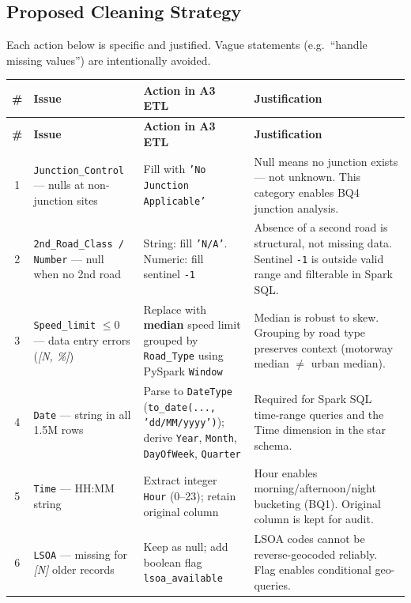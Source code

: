 \documentclass[12pt, a4paper]{article}
\newcommand{\ph}[1]{{\color{phred}\textit{[#1]}}}
\begin{document}
\subsection{Proposed Cleaning Strategy}

Each action below is specific and justified.
Vague statements (e.g.\ ``handle missing values'') are intentionally avoided.

\begin{longtable}{c L{3cm} L{5cm} L{4.2cm}}
\toprule
\textbf{\#} & \textbf{Issue} & \textbf{Action in A3 ETL} & \textbf{Justification} \\
\midrule
\endfirsthead
\toprule
\textbf{\#} & \textbf{Issue} & \textbf{Action in A3 ETL} & \textbf{Justification} \\
\midrule
\endhead
\bottomrule
\endlastfoot
\small
{}
1 &
\texttt{Junction\_Control} — nulls at non-junction sites &
Fill with \texttt{'No Junction Applicable'} &
Null means no junction exists — not unknown. This category enables BQ4 junction analysis. \\

2 &
\texttt{2nd\_Road\_Class / Number} — null when no 2nd road &
String: fill \texttt{'N/A'}. Numeric: fill sentinel \texttt{-1} &
Absence of a second road is structural, not missing data. Sentinel \texttt{-1} is outside valid range and filterable in Spark SQL. \\

3 &
\texttt{Speed\_limit} $\leq 0$ — data entry errors (\ph{N, \%}) &
Replace with \textbf{median} speed limit grouped by \texttt{Road\_Type} using PySpark \texttt{Window} &
Median is robust to skew. Grouping by road type preserves context (motorway median $\neq$ urban median). \\

4 &
\texttt{Date} — string in all 1.5M rows &
Parse to \texttt{DateType} (\texttt{to\_date(..., 'dd/MM/yyyy')}); derive \texttt{Year}, \texttt{Month}, \texttt{DayOfWeek}, \texttt{Quarter} &
Required for Spark SQL time-range queries and the Time dimension in the star schema. \\

5 &
\texttt{Time} — HH:MM string &
Extract integer \texttt{Hour} (0–23); retain original column &
Hour enables morning/afternoon/night bucketing (BQ1). Original column is kept for audit. \\

6 &
\texttt{LSOA} — missing for \ph{N} older records &
Keep as null; add boolean flag \texttt{lsoa\_available} &
LSOA codes cannot be reverse-geocoded reliably. Flag enables conditional geo-queries. \\


\end{longtable}
\end{document}
